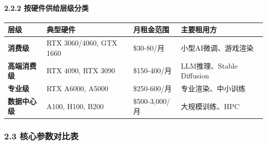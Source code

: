 \documentclass[UTF8,a4paper,12pt]{ctexart}
\begin{document}
\paragraph{2.2.2
按硬件供给层级分类}\label{ux6309ux786cux4ef6ux4f9bux7ed9ux5c42ux7ea7ux5206ux7c7b}

{\def\LTcaptype{none} %
\begin{longtable}[]{@{}
  >{\raggedright\arraybackslash}p{}
  >{\raggedright\arraybackslash}p{}
  >{\raggedright\arraybackslash}p{}
  >{\raggedright\arraybackslash}p{}@{}}
\toprule\noalign{}
\begin{minipage}[b]{\linewidth}\raggedright
层级
\end{minipage} & \begin{minipage}[b]{\linewidth}\raggedright
典型硬件
\end{minipage} & \begin{minipage}[b]{\linewidth}\raggedright
月租金范围
\end{minipage} & \begin{minipage}[b]{\linewidth}\raggedright
主要租用方
\end{minipage} \\
\midrule\noalign{}
\endhead
\bottomrule\noalign{}
\endlastfoot
\textbf{消费级} & RTX 3060/4060, GTX 1660 & \$30-80/月 &
小型AI微调、游戏渲染 \\
\textbf{高端消费级} & RTX 4090, RTX 3090 & \$150-400/月 &
LLM推理、Stable Diffusion \\
\textbf{专业级} & RTX A6000, A5000 & \$250-600/月 &
专业渲染、中小训练 \\
\textbf{数据中心级} & A100, H100, B200 & \$500-3,000/月 &
大规模训练、HPC \\
\end{longtable}
}

\subsubsection{2.3
核心参数对比表}\label{ux6838ux5fc3ux53c2ux6570ux5bf9ux6bd4ux8868}
\end{document}
